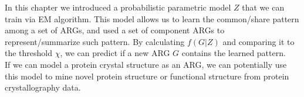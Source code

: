 In this chapter we introduced a probabilistic parametric model $Z$ that we can train via EM algorithm. This model allows us to learn the common/share pattern among a set of ARGs, and used a set of component ARGs to represent/summarize such pattern. By calculating $f(G|Z)$ and comparing it to the threshold $\chi$, we can predict if a new ARG $G$ contains the learned pattern.\\

If we can model a protein crystal structure as an ARG, we can potentially use this model to mine novel protein structure or functional structure from protein crystallography data.







